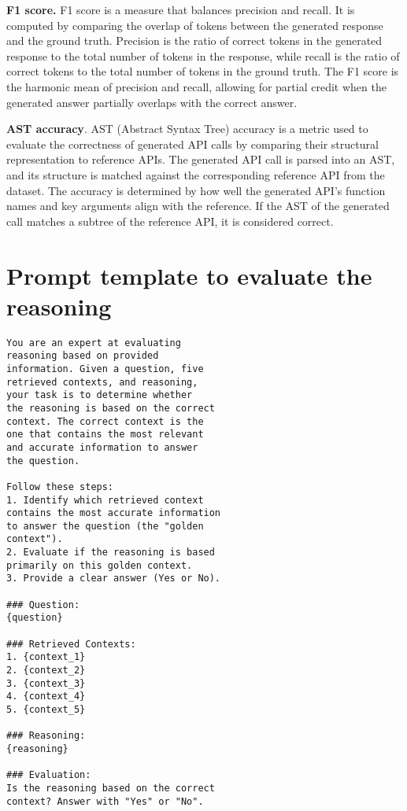 \noindent \textbf{F1 score.} F1 score is a measure that balances precision and recall. It is computed by comparing the overlap of tokens between the generated response and the ground truth. Precision is the ratio of correct tokens in the generated response to the total number of tokens in the response, while recall is the ratio of correct tokens to the total number of tokens in the ground truth. The F1 score is the harmonic mean of precision and recall, allowing for partial credit when the generated answer partially overlaps with the correct answer.

\noindent \textbf{AST accuracy}. AST (Abstract Syntax Tree) accuracy is a metric used to evaluate the correctness of generated API calls by comparing their structural representation to reference APIs. The generated API call is parsed into an AST, and its structure is matched against the corresponding reference API from the dataset. The accuracy is determined by how well the generated API’s function names and key arguments align with the reference. If the AST of the generated call matches a subtree of the reference API, it is considered correct.
 






\section{Prompt template to evaluate the reasoning}

\begin{tcolorbox}[fonttitle=\small\bfseries,
fontupper=\scriptsize\sffamily,
fontlower=\fon{put},
colback=gray!5!white, colframe=gray!75!black,
enhanced,
left=2pt, right=2pt, top=2pt, bottom=2pt,
title=Prompt template to evaluate reasoning]
\begin{lstlisting}[]
You are an expert at evaluating 
reasoning based on provided 
information. Given a question, five 
retrieved contexts, and reasoning, 
your task is to determine whether 
the reasoning is based on the correct 
context. The correct context is the 
one that contains the most relevant 
and accurate information to answer 
the question.

Follow these steps:
1. Identify which retrieved context 
contains the most accurate information 
to answer the question (the "golden 
context").
2. Evaluate if the reasoning is based 
primarily on this golden context.
3. Provide a clear answer (Yes or No).

### Question:
{question}

### Retrieved Contexts:
1. {context_1}
2. {context_2}
3. {context_3}
4. {context_4}
5. {context_5}

### Reasoning:
{reasoning}

### Evaluation:
Is the reasoning based on the correct 
context? Answer with "Yes" or "No".
\end{lstlisting}
\end{tcolorbox}


